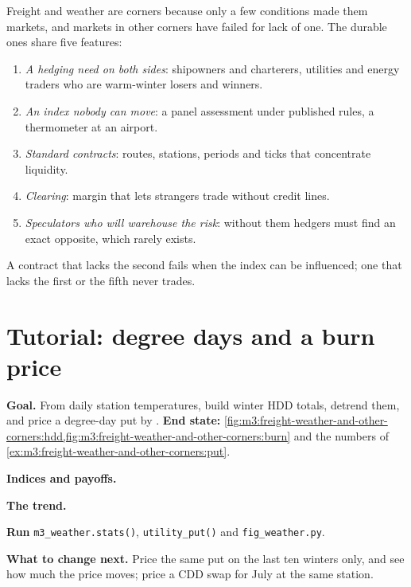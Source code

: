 Freight and weather are corners because only a few conditions made them markets, and markets in other
corners have failed for lack of one. The durable ones share five features:
\begin{enumerate}
\item \emph{A hedging need on both sides}: shipowners and charterers, utilities and energy traders who
are warm-winter losers and winners.
\item \emph{An index nobody can move}: a panel assessment under published rules, a thermometer at an
airport.
\item \emph{Standard contracts}: routes, stations, periods and ticks that concentrate liquidity.
\item \emph{Clearing}: margin that lets strangers trade without credit lines.
\item \emph{Speculators who will warehouse the risk}: without them hedgers must find an exact opposite,
which rarely exists.
\end{enumerate}
A contract that lacks the second fails when the index can be influenced; one that lacks the first or the
fifth never trades.

\section{Tutorial: degree days and a burn price}\label{tut:m3:freight-weather-and-other-corners:burn}

\begin{tutorial}
\textbf{Goal.} From daily station temperatures, build winter HDD totals, detrend them, and price a
degree-day put by . \textbf{End state:}
\cref{fig:m3:freight-weather-and-other-corners:hdd,fig:m3:freight-weather-and-other-corners:burn} and the
numbers of \cref{ex:m3:freight-weather-and-other-corners:put}.
\begin{tutsteps}
\item \textbf{Indices and payoffs.}
\label{lst:m3:freight-weather-and-other-corners:burn}
\item \textbf{The trend.}
\label{lst:m3:freight-weather-and-other-corners:detrend}
\item \textbf{Run} \texttt{m3\_weather.stats()}, \texttt{utility\_put()} and \texttt{fig\_weather.py}.
\end{tutsteps}
\textbf{What to change next.} Price the same put on the last ten winters only, and see how much the price
moves; price a CDD swap for July at the same station.
\end{tutorial}

